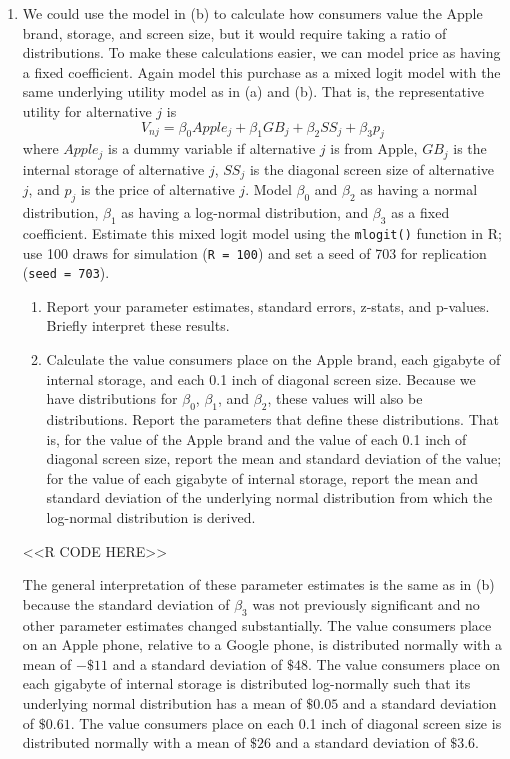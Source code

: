 \documentclass[11pt,letterpaper]{article}
\begin{document}
\begin{enumerate}[label=\alph*., leftmargin=*]
	\item We could use the model in (b) to calculate how consumers value the Apple brand, storage, and screen size, but it would require taking a ratio of distributions. To make these calculations easier, we can model price as having a fixed coefficient. Again model this purchase as a mixed logit model with the same underlying utility model as in (a) and (b). That is, the representative utility for alternative $j$ is
	$$V_{nj} = \beta_0 Apple_j + \beta_1 GB_j + \beta_2 SS_j + \beta_3 p_j$$
	where $Apple_j$ is a dummy variable if alternative $j$ is from Apple, $GB_j$ is the internal storage of alternative $j$, $SS_j$ is the diagonal screen size of alternative $j$, and $p_j$ is the price of alternative $j$. Model $\beta_0$ and $\beta_2$ as having a normal distribution, $\beta_1$ as having a log-normal distribution, and $\beta_3$ as a fixed coefficient. Estimate this mixed logit model using the \texttt{mlogit()} function in R; use 100 draws for simulation (\texttt{R = 100}) and set a seed of 703 for replication (\texttt{seed = 703}).
	\begin{enumerate}[label=\roman*.]
		\item Report your parameter estimates, standard errors, z-stats, and p-values. Briefly interpret these results. 
		\item Calculate the value consumers place on the Apple brand, each gigabyte of internal storage, and each 0.1 inch of diagonal screen size. Because we have distributions for $\beta_0$, $\beta_1$, and $\beta_2$, these values will also be distributions. Report the parameters that define these distributions. That is, for the value of the Apple brand and the value of each 0.1 inch of diagonal screen size, report the mean and standard deviation of the value; for the value of each gigabyte of internal storage, report the mean and standard deviation of the underlying normal distribution from which the log-normal distribution is derived.
	\end{enumerate}

	<<R CODE HERE>>

	The general interpretation of these parameter estimates is the same as in (b) because the standard deviation of $\beta_3$ was not previously significant and no other parameter estimates changed substantially. The value consumers place on an Apple phone, relative to a Google phone, is distributed normally with a mean of $-\$11$ and a standard deviation of $\$48$. The value consumers place on each gigabyte of internal storage is distributed log-normally such that its underlying normal distribution has a mean of $\$0.05$ and a standard deviation of $\$0.61$. The value consumers place on each 0.1 inch of diagonal screen size is distributed normally with a mean of $\$26$ and a standard deviation of $\$3.6$.


\end{enumerate}
\end{document}
